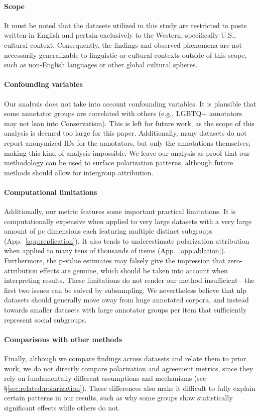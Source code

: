 \documentclass{article} %
\theoremstyle{definition}
\theoremstyle{plain}
\begin{document}
\paragraph{Scope} It must be noted that the datasets utilized in this study are restricted to posts written in English and pertain exclusively to the Western, specifically U.S., cultural context. Consequently, the findings and observed phenomena are not necessarily generalizable to linguistic or cultural contexts outside of this scope, such as non-English languages or other global cultural spheres.

\paragraph{Confounding variables} Our analysis does not take into account confounding variables. It is plausible that some annotator groups are correlated with others (e.g., LGBTQ+ annotators may not lean into Conservatism). This is left for future work, as the scope of this analysis is deemed too large for this paper. Additionally, many datasets do not report anonymized IDs for the annotators, but only the annotations themselves, making this kind of analysis impossible. We leave our analysis as proof that our methodology can be used to surface polarization patterns, although future methods should allow for intergroup attribution.

\paragraph{Computational limitations} Additionally, our metric features some important practical limitations. It is computationally expensive when applied to very large datasets with a very large amount of \ac{pc} dimensions each featuring multiple distinct subgroups (App.~\ref{app:replication}). It also tends to underestimate polarization attribution when applied to many tens of thousands of items (App.~\ref{app:ablation}). Furthermore, the p-value estimates may falsely give the impression that zero-attribution effects are genuine, which should be taken into account when interpreting results. These limitations do not render our method insufficient---the first two issues can be solved by subsampling. We nevertheless believe that \ac{nlp} datasets should generally move away from huge annotated corpora, and instead towards smaller datasets with large annotator groups per item that sufficiently represent social subgroups.

\paragraph{Comparisons with other methods} Finally, although we compare findings across datasets and relate them to prior work, we do not directly compare polarization and agreement metrics, since they rely on fundamentally different assumptions and mechanisms (see \S\ref{sec:related:polarization}). These differences also make it difficult to fully explain certain patterns in our results, such as why some groups show statistically significant effects while others do not.
\end{document}
